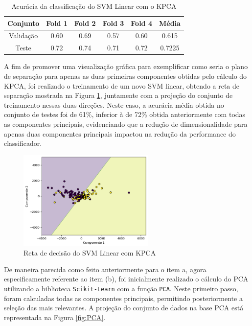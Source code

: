 \documentclass[]{abntex2}
\begin{document}
\begin{table}[H]
    \centering
    \begin{tabular}{|c|c|c|c|c|c|}
    \hline
    \rowcolor[HTML]{C0C0C0} 
    Conjunto                          & Fold 1 & Fold 2 & Fold 3 & Fold 4 & Média  \\ \hline
    \cellcolor[HTML]{C0C0C0}Validação & 0.60   & 0.69   & 0.57   & 0.60   & 0.615  \\ \hline
    \cellcolor[HTML]{C0C0C0}Teste     & 0.72   & 0.74   & 0.71   & 0.72   & 0.7225 \\ \hline
    \end{tabular}
    \caption{Acurácia da classificação do SVM Linear com o KPCA}
    \label{tab:kpca_svm}
\end{table}

A fim de promover uma visualização gráfica para exemplificar como seria o plano de separação para apenas as duas primeiras componentes obtidas pelo cálculo do KPCA, foi realizado o treinamento de um novo SVM linear, obtendo a reta de separação mostrada na Figura \ref{fig:kpca_reta}, juntamente com a projeção do conjunto de treinamento nessas duas direções. Neste caso, a acurácia média obtida no conjunto de testes foi de 61\%, inferior à de 72\% obtida anteriormente com todas as componentes principais, evidenciando que a redução de dimensionalidade para apenas duas componentes principais impactou na redução da performance do classificador.

\begin{figure}
    \centering 
    \includegraphics[width=0.6\textwidth]{imgs/ex1/kpca_reta.png}
    \caption{Reta de decisão do SVM Linear com KPCA}
    \label{fig:kpca_reta} %
\end{figure}

\newpage

De maneira parecida como feito anteriormente para o item a, agora especificamente referente ao item (b), foi inicialmente realizado o cálculo do PCA utilizando a biblioteca \texttt{Scikit-Learn} com a função \texttt{PCA}. Neste primeiro passo, foram calculadas todas as componentes principais, permitindo posteriormente a seleção das mais relevantes. A projeção do conjunto de dados na base PCA está representada na Figura \ref{fig:PCA}.
\end{document}
